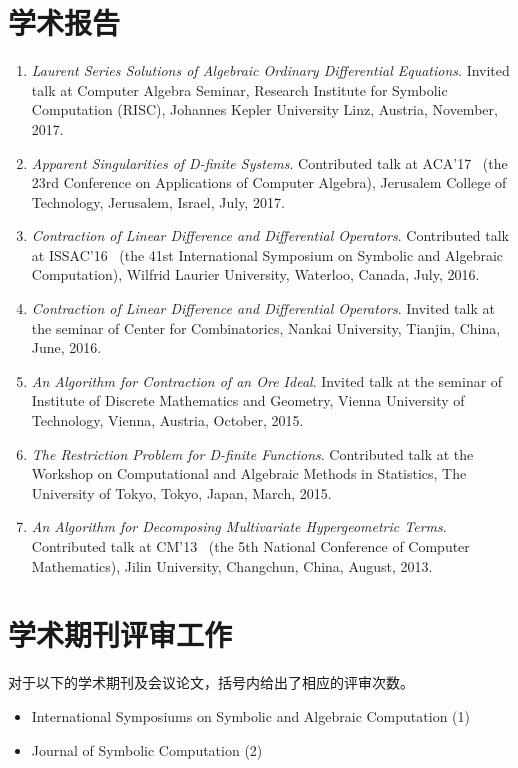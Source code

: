 \documentclass[a4paper,12pt]{article}
\begin{document}
\begin{CJK*}{UTF8}{gbsn}
\section*{\Large{学术报告}}
\begin{enumerate}
 \item {\em Laurent Series Solutions of Algebraic Ordinary Differential Equations}. 
 Invited talk at Computer Algebra Seminar, Research Institute for Symbolic Computation (RISC), Johannes Kepler University Linz, 
 Austria, November, 2017.
 \item {\em Apparent Singularities of D-finite Systems}. Contributed talk at ACA'17 
 \ (the 23rd Conference on Applications of Computer Algebra), Jerusalem College of Technology, Jerusalem, Israel, July, 2017.
 \item {\em Contraction of Linear Difference and Differential Operators}. Contributed talk at ISSAC'16 
 \ (the 41st International Symposium on Symbolic and Algebraic Computation), Wilfrid Laurier University, Waterloo, Canada, July, 2016.
 \item {\em Contraction of Linear Difference and Differential Operators}.
       Invited talk at the seminar of Center for Combinatorics, Nankai University, Tianjin, China, June, 2016.
 \item {\em An Algorithm for Contraction of an Ore Ideal}. Invited talk at the seminar of Institute of Discrete Mathematics and Geometry, 
       Vienna University of Technology, Vienna, Austria, October, 2015.
 \item {\em The Restriction Problem for D-finite Functions}. 
       Contributed talk at the Workshop on Computational and Algebraic Methods in Statistics,
       The University of Tokyo, Tokyo, Japan, March, 2015.
 \item {\em An Algorithm for Decomposing Multivariate Hypergeometric Terms}. Contributed talk at CM'13
       \ (the 5th National Conference of Computer Mathematics), Jilin University, Changchun, China, August, 2013.
\end{enumerate}

\section*{\Large 学术期刊评审工作}
对于以下的学术期刊及会议论文，括号内给出了相应的评审次数。
\begin{itemize}
 \item International Symposiums on Symbolic and Algebraic Computation (1)
 \item Journal of Symbolic Computation (2)
\end{itemize}


\end{CJK*}
\end{document}
